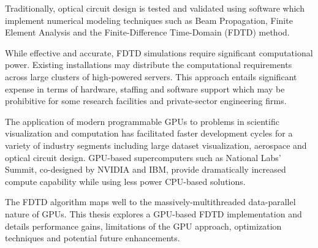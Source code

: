 Traditionally, optical circuit design is tested and validated using software which implement numerical modeling techniques such as Beam Propagation, Finite Element Analysis and the Finite-Difference Time-Domain (FDTD) method.

While effective and accurate, FDTD simulations require significant computational power. Existing installations may distribute the computational requirements across large clusters of high-powered servers. This approach entails significant expense in terms of hardware, staffing and software support which may be prohibitive for some research facilities and private-sector engineering firms.

The application of modern programmable GPUs to problems in scientific visualization and computation has facilitated faster development cycles for a variety of industry segments including large dataset visualization\cite{raycasting}, aerospace\cite{Strzodka2013381} and optical circuit design. GPU-based supercomputers such as National Labs' Summit\cite{nvidiaNationalLabs}, co-designed by NVIDIA and IBM, provide dramatically increased compute capability while using less power CPU-based solutions. 

The FDTD algorithm maps well to the massively-multithreaded data-parallel nature of GPUs. This thesis explores a GPU-based FDTD implementation and details performance gains, limitations of the GPU approach, optimization techniques and potential future enhancements. 